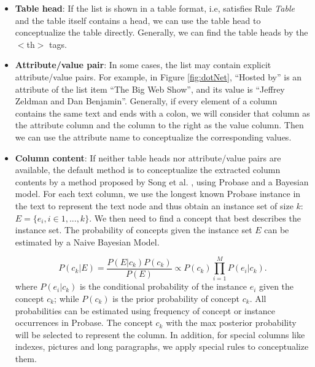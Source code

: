 \begin{itemize}
\item \textbf{Table head}: If the list is shown in a table format,
  i.e, satisfies Rule \emph{Table} and the table itself contains a
  head, we can use the table head to conceptualize the table directly.
  Generally, we can find the table heads by the $<$th$>$ tags.

  \item \textbf{Attribute/value pair}:
  In some cases, the list may contain explicit attribute/value pairs.
  For example, in Figure \ref{fig:dotNet},
  ``Hosted by'' is an attribute of the list item ``The Big Web Show'',
  and its value is ``Jeffrey Zeldman and Dan Benjamin''.
  Generally, if every element of a column contains the same text and
  ends with a colon,
  we will consider that column as the attribute column and the
  column to the right as the value column.
  Then we can use the attribute name to conceptualize the
  corresponding values.

  \item \textbf{Column content}:
  If neither table heads nor attribute/value pairs are available,
  the default method is to conceptualize the extracted column contents
  by a method proposed by Song et al. \cite{Song11:Conceptualize},
  using Probase and a Bayesian model.
  For each text column,  we use the longest known Probase instance in
the text to represent the text node and thus obtain
an instance set of size $k$: $E=\{e_{i},i \in 1,...,k\}$.
We then need to find a concept that best describes the instance set.
The probability of concepts given the instance set $E$ can be
estimated by a Naive Bayesian Model.

\begin{equation*}
    P(c_{k}|E)=\frac{P(E|c_{k})P(c_{k})}{P(E)}
    \propto P(c_{k})\prod_{i=1}^{M}P(e_{i}|c_{k}).
\end{equation*}
where $P(e_{i}|c_{k})$ is the conditional probability
of the instance $e_{i}$ given the concept $c_{k}$;
while $P(c_{k})$ is the prior probability of concept $c_{k}$.
All probabilities can be estimated using frequency of concept or instance
occurrences in Probase.
The concept $c_{k}$ with the max posterior probability will be
selected to represent the column.
In addition, for special columns like indexes, pictures and long paragraphs,
we apply special rules to conceptualize them.
\end{itemize}

